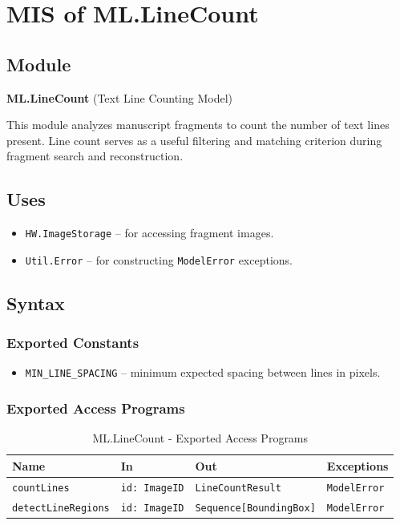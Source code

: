 \documentclass[12pt, titlepage]{article}
\begin{document}
\section{MIS of ML.LineCount} \label{ML.LineCount}

\subsection{Module}
\textbf{ML.LineCount} \; (Text Line Counting Model)

This module analyzes manuscript fragments to count the number of text lines present. Line count serves as a useful filtering and matching criterion during fragment search and reconstruction.

\subsection{Uses}
\begin{itemize}
    \item \texttt{HW.ImageStorage} – for accessing fragment images.
    \item \texttt{Util.Error} – for constructing \texttt{ModelError} exceptions.
\end{itemize}

\subsection{Syntax}

\subsubsection{Exported Constants}
\begin{itemize}
    \item \texttt{MIN\_LINE\_SPACING} – minimum expected spacing between lines in pixels.
\end{itemize}

\subsubsection{Exported Access Programs}

\begin{table}[H]
\centering
\small
\caption{ML.LineCount - Exported Access Programs}
\begin{tabular}{p{3.5cm} p{3.5cm} p{3.5cm} p{3.5cm}}
\toprule
\textbf{Name} & \textbf{In} & \textbf{Out} & \textbf{Exceptions} \\
\midrule
\texttt{countLines} & \texttt{id: ImageID} & \texttt{LineCountResult} & \texttt{ModelError} \\
\texttt{detectLineRegions} & \texttt{id: ImageID} & \texttt{Sequence[BoundingBox]} & \texttt{ModelError} \\
\bottomrule
\end{tabular}
\end{table}
\end{document}

